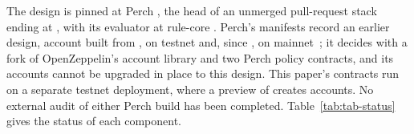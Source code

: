 The design is pinned at Perch , the head of an unmerged
pull-request stack ending at , with its evaluator at
rule-core . Perch's manifests record an earlier design,
account  built from
, on testnet and, since
, on mainnet~; it
decides with a fork of OpenZeppelin's account library and two Perch policy
contracts, and its accounts cannot be upgraded in place to this design. This
paper's contracts run on a separate testnet deployment, where a preview of
 creates accounts. No external audit of either Perch build has
been completed. Table~\ref{tab:tab-status} gives the status of each component.
